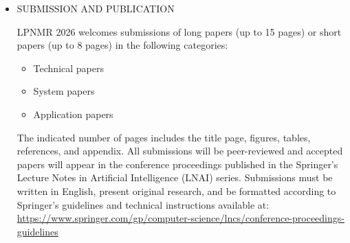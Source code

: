 \documentclass[prodmode,acmtecs]{acmsmall} %
\begin{document}
\begin{itemize}
\begin{itemize}\item  Foundations of LPNMR: Semantics of new and existing languages; Action languages; Causality; Formalization of Commonsense Reasoning and understanding its laws and nature; Relationships among formalisms; Complexity and expressive power; Inference algorithms and heuristics for LPNMR systems; Extensions of traditional LPNMR languages such as new logical connectives or new inference capabilities; Updates, revision, and other operations on LPNMR systems; Uncertainty in LPNMR systems
\item  Implementation of LPNMR systems: System descriptions, comparisons, and evaluations; Algorithms and novel techniques for efficient evaluation; LPNMR benchmarks; Systems using LPNMR subsystems
\item  Applications of LPNMR: Use of LPNMR in Commonsense Reasoning and other areas of knowledge representation; LPNMR languages and algorithms in planning, diagnosis, and argumentation; Reasoning with preferences, decision making, and policies; Applications of LPNMR languages in data integration and exchange systems; Software engineering and model checking; Applications of LPNMR to bioinformatics, linguistics, psychology, and other sciences; Integration of LPNMR systems with other computational paradigms
\end{itemize} 
\item  SUBMISSION AND PUBLICATION 
 
  LPNMR 2026 welcomes submissions of long papers (up to 15 pages) or short papers (up to 8 pages) in the following categories: 
 
\begin{itemize}\item  Technical papers
\item  System papers
\item  Application papers
\end{itemize} 
  The indicated number of pages includes the title page, figures, tables, references, and appendix. All submissions will be peer-reviewed and accepted papers will appear in the conference proceedings published in the Springer's Lecture Notes in Artificial Intelligence (LNAI) series. Submissions must be written in English, present original research, and be formatted according to Springer's guidelines and technical instructions available at: \href{https://www.springer.com/gp/computer-science/lncs/conference-proceedings-guidelines}{https://www.springer.com/gp/computer-science/lncs/conference-proceedings-guidelines} 
 

\end{itemize}
\end{document}
